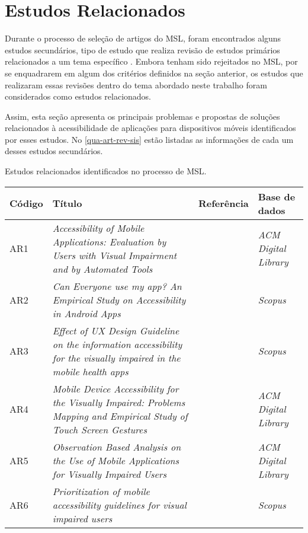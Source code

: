 \section{Estudos Relacionados}

Durante o processo de seleção de artigos do MSL, foram encontrados alguns estudos secundários, tipo de estudo que realiza revisão de estudos primários
relacionados a um tema específico \cite{Kitchenham2007}. Embora tenham sido rejeitados no MSL, por se enquadrarem em algum dos critérios definidos
na seção anterior, os estudos que realizaram essas revisões dentro do tema abordado neste trabalho foram considerados como estudos relacionados.

Assim, esta seção apresenta os principais problemas e propostas de soluções relacionados à acessibilidade de aplicações para dispositivos móveis
identificados por esses estudos. No \autoref{qua-art-rev-sis} estão listadas as informações de cada um desses estudos secundários.

\begin{quadro}[htb!]
  \caption{\label{qua-art-rev-sis}Estudos relacionados identificados no processo de MSL.}
  \begin{tabular}{|m{1.2cm} | m{8.1cm} | m{2.7cm} | m{2.5cm}|}
    \hline
    \textbf{Código} & \textbf{Título}                                                                                                             & \textbf{Referência}  & \textbf{Base de dados}     \\
    \hline
    AR1             & \emph{Accessibility of Mobile Applications: Evaluation by Users with Visual Impairment and by Automated Tools}              & \cite{Mateus2020}    & \emph{ACM Digital Library} \\
    \hline
    AR2             & \emph{Can Everyone use my app? An Empirical Study on Accessibility in Android Apps}                                         & \cite{Vendome201941} & \emph{Scopus}              \\
    \hline
    AR3             & \emph{Effect of UX Design Guideline on the information accessibility for the visually impaired in the mobile health apps}   & \cite{Kim20191103}   & \emph{Scopus}              \\
    \hline
    AR4             & \emph{Mobile Device Accessibility for the Visually Impaired: Problems Mapping and Empirical Study of Touch Screen Gestures} & \cite{Damaceno2016}  & \emph{ACM Digital Library} \\
    \hline
    AR5             & \emph{Observation Based Analysis on the Use of Mobile Applications for Visually Impaired Users}                             & \cite{Siebra2016}    & \emph{ACM Digital Library} \\
    \hline
    AR6             & \emph{Prioritization of mobile accessibility guidelines for visual impaired users}                                          & \cite{Quispe2020}    & \emph{Scopus}              \\
    \hline
  \end{tabular}
\end{quadro}

